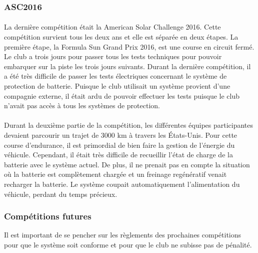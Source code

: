 	\subsubsection{ASC2016}
		
		\paragraph{}
		La dernière compétition était la American Solar Challenge 2016. Cette compétition survient tous les deux ans et elle est séparée en deux étapes. La première étape, la Formula Sun Grand Prix 2016, est une course en circuit fermé. Le club a trois jours pour passer tous les tests techniques pour pouvoir embarquer sur la piste les trois jours suivants. Durant la dernière compétition, il a été très difficile de passer les tests électriques concernant le système de protection de batterie. Puisque le club utilisait un système provient d'une compagnie externe, il était ardu de pouvoir effectuer les tests puisque le club n'avait pas accès à tous les systèmes de protection.
		
		\paragraph{}
		Durant la deuxième partie de la compétition, les différentes équipes participantes devaient parcourir un trajet de 3000 km à travers les États-Unis. Pour cette course d'endurance, il est primordial de bien faire la gestion de l'énergie du véhicule. Cependant, il était très difficile de recueillir l'état de charge de la batterie avec le système actuel. De plus, il ne prenait pas en compte la situation où la batterie est complètement chargée et un freinage regénératif venait recharger la batterie. Le système coupait automatiquement l'alimentation du véhicule, perdant du temps précieux.
		
	\subsubsection{Compétitions futures}
		Il est important de se pencher sur les règlements des prochaines compétitions pour que le système soit conforme et pour que le club ne subisse pas de pénalité.
		

